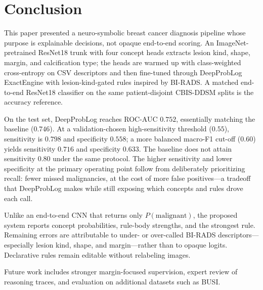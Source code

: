 \section{Conclusion}
\label{sec:conclusion}

This paper presented a neuro-symbolic breast cancer diagnosis pipeline whose purpose is explainable decisions, not opaque end-to-end scoring. An ImageNet-pretrained ResNet18 trunk with four concept heads extracts lesion kind, shape, margin, and calcification type; the heads are warmed up with class-weighted cross-entropy on CSV descriptors and then fine-tuned through DeepProbLog ExactEngine with lesion-kind-gated rules inspired by BI-RADS. A matched end-to-end ResNet18 classifier on the same patient-disjoint CBIS-DDSM splits is the accuracy reference.

On the test set, DeepProbLog reaches ROC-AUC $0.752$, essentially matching the baseline ($0.746$). At a validation-chosen high-sensitivity threshold ($0.55$), sensitivity is $0.798$ and specificity $0.558$; a more balanced macro-F1 cut-off ($0.60$) yields sensitivity $0.716$ and specificity $0.633$. The baseline does not attain sensitivity $0.80$ under the same protocol. The higher sensitivity and lower specificity at the primary operating point follow from deliberately prioritizing recall: fewer missed malignancies, at the cost of more false positives---a tradeoff that DeepProbLog makes while still exposing which concepts and rules drove each call.

Unlike an end-to-end CNN that returns only $P(\mathrm{malignant})$, the proposed system reports concept probabilities, rule-body strengths, and the strongest rule. Remaining errors are attributable to under- or over-called BI-RADS descriptors---especially lesion kind, shape, and margin---rather than to opaque logits. Declarative rules remain editable without relabeling images.

Future work includes stronger margin-focused supervision, expert review of reasoning traces, and evaluation on additional datasets such as BUSI.
